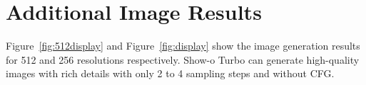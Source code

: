 \section{Additional Image Results}

Figure~\ref{fig:512display} and Figure~\ref{fig:display} show the image generation results for 512 and 256 resolutions respectively. 
Show-o Turbo can generate high-quality images with rich details with only 2 to 4 sampling steps and without CFG.


